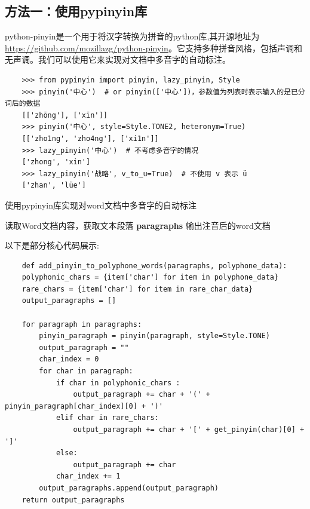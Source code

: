 \documentclass[12pt,hyperref,a4paper,UTF8]{ctexart}
\begin{document}
\subsection{方法一：使用pypinyin库}
python-pinyin是一个用于将汉字转换为拼音的python库,其开源地址为\url{https://github.com/mozillazg/python-pinyin}。它支持多种拼音风格，包括声调和无声调。我们可以使用它来实现对文档中多音字的自动标注。
\begin{lstlisting}
    >>> from pypinyin import pinyin, lazy_pinyin, Style
    >>> pinyin('中心')  # or pinyin(['中心'])，参数值为列表时表示输入的是已分词后的数据
    [['zhōng'], ['xīn']]
    >>> pinyin('中心', style=Style.TONE2, heteronym=True)
    [['zho1ng', 'zho4ng'], ['xi1n']]
    >>> lazy_pinyin('中心')  # 不考虑多音字的情况
    ['zhong', 'xin']
    >>> lazy_pinyin('战略', v_to_u=True)  # 不使用 v 表示 ü
    ['zhan', 'lüe']
\end{lstlisting}
\begin{algorithm}[H]
    \caption{使用pypinyin库实现对word文档中多音字的自动标注}
    
    
    
    \BlankLine
    读取Word文档内容，获取文本段落 \textbf{paragraphs}\;
    输出注音后的word文档\;
\end{algorithm}
\vspace{\baselineskip}
以下是部分核心代码展示:
\begin{lstlisting}
    def add_pinyin_to_polyphone_words(paragraphs, polyphone_data):
    polyphonic_chars = {item['char'] for item in polyphone_data}
    rare_chars = {item['char'] for item in rare_char_data}
    output_paragraphs = []

    for paragraph in paragraphs:
        pinyin_paragraph = pinyin(paragraph, style=Style.TONE)
        output_paragraph = ""
        char_index = 0
        for char in paragraph:
            if char in polyphonic_chars :
                output_paragraph += char + '(' + pinyin_paragraph[char_index][0] + ')'
            elif char in rare_chars:
                output_paragraph += char + '[' + get_pinyin(char)[0] + ']'
            else:
                output_paragraph += char
            char_index += 1
        output_paragraphs.append(output_paragraph)
    return output_paragraphs
\end{lstlisting}
\end{document}
